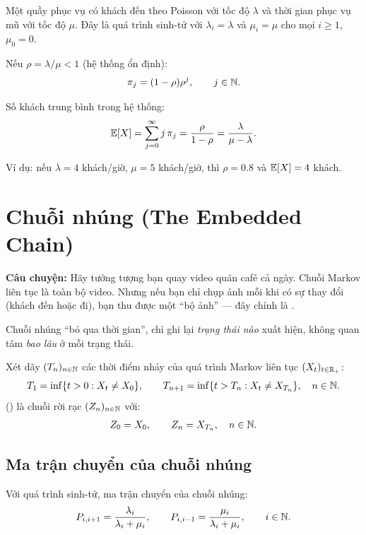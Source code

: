 \begin{example}
\label{ex:mm1-queue}
Một quầy phục vụ có khách đến theo Poisson với tốc độ $\lambda$ và thời gian phục vụ mũ với tốc độ $\mu$.
Đây là quá trình sinh-tử với $\lambda_i = \lambda$ và $\mu_i = \mu$ cho mọi $i \geq 1$, $\mu_0 = 0$.

Nếu $\rho = \lambda/\mu < 1$ (hệ thống ổn định):
\[
  \pi_j = (1 - \rho)\rho^j, \qquad j \in \mathbb{N}.
\]

Số khách trung bình trong hệ thống:
\[
  \mathbb{E}[X] = \sum_{j=0}^{\infty} j\, \pi_j = \frac{\rho}{1-\rho} = \frac{\lambda}{\mu - \lambda}.
\]

Ví dụ: nếu $\lambda = 4$ khách/giờ, $\mu = 5$ khách/giờ, thì $\rho = 0.8$ và $\mathbb{E}[X] = 4$ khách.
\end{example}

\section{Chuỗi nhúng (The Embedded Chain)}
\label{sec:embedded}

\textbf{Câu chuyện:} Hãy tưởng tượng bạn quay video quán café cả ngày. Chuỗi Markov liên tục là toàn bộ video.
Nhưng nếu bạn chỉ chụp ảnh mỗi khi có sự thay đổi (khách đến hoặc đi),
bạn thu được một ``bộ ảnh'' --- đây chính là .

Chuỗi nhúng ``bỏ qua thời gian'', chỉ ghi lại \emph{trạng thái nào} xuất hiện, không quan tâm \emph{bao lâu} ở mỗi trạng thái.

\begin{dinhnghia}
Xét dãy $(T_n)_{n\in\mathbb{N}}$ các thời điểm nhảy của quá trình Markov liên tục $(X_t)_{t\in\mathbb{R}_+}$:
\[
  T_1 = \inf\{t > 0 : X_t \neq X_0\}, \qquad
  T_{n+1} = \inf\{t > T_n : X_t \neq X_{T_n}\}, \quad n \in \mathbb{N}.
\]
 () là chuỗi rời rạc $(Z_n)_{n\in\mathbb{N}}$ với:
\[
  Z_0 = X_0, \qquad Z_n = X_{T_n}, \quad n \in \mathbb{N}.
\]
\end{dinhnghia}

\subsection{Ma trận chuyển của chuỗi nhúng}

Với quá trình sinh-tử, ma trận chuyển của chuỗi nhúng:
\[
  P_{i,i+1} = \frac{\lambda_i}{\lambda_i + \mu_i}, \qquad
  P_{i,i-1} = \frac{\mu_i}{\lambda_i + \mu_i}, \qquad i \in \mathbb{N}.
\]

